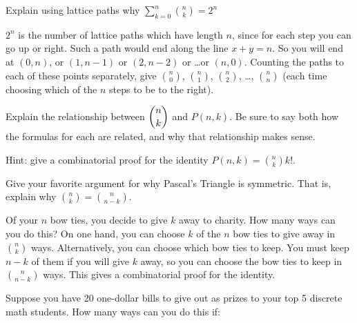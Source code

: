 \begin{questions}
	


\question Explain using lattice paths why $\sum_{k=0}^n {n \choose k} = 2^n$

	\begin{answer}
		$2^n$ is the number of lattice paths which have length $n$, since for each step you can go up or right.  Such a path would end along the line $x + y = n$.  So you will end at $(0,n)$, or $(1,n-1)$ or $(2, n-2)$ or \ldots or $(n,0)$.  Counting the paths to each of these points separately, give ${n \choose 0}$, ${n \choose 1}$, ${n \choose 2}$, \ldots, ${n \choose n}$ (each time choosing which of the $n$ steps to be to the right).
	\end{answer}
	
	

 
\question Explain the relationship between $\displaystyle{n\choose k}$ and $P(n,k)$.  Be sure to say both how the formulas for each are related, and why that relationship makes sense.

	\begin{answer}
		Hint: give a combinatorial proof for the identity $P(n,k) = {n \choose k} k!$.
	\end{answer}
	
	


\question Give your favorite argument for why Pascal's Triangle is symmetric.  That is, explain why \({n \choose k} = {n \choose n-k}\).

	\begin{answer}
		Of your $n$ bow ties, you decide to give $k$ away to charity.  How many ways can you do this?  On one hand, you can choose $k$ of the $n$ bow ties to give away in ${n \choose k}$ ways.  Alternatively, you can choose which bow ties to keep.  You must keep $n -k$ of them if you will give $k$ away, so you can choose the bow ties to keep in ${n \choose n-k}$ ways.  This gives a combinatorial proof for the identity.
	\end{answer}
	
	



\question Suppose you have 20 one-dollar bills to give out as prizes to your top 5 discrete math students.  How many ways can you do this if:
\end{questions}
